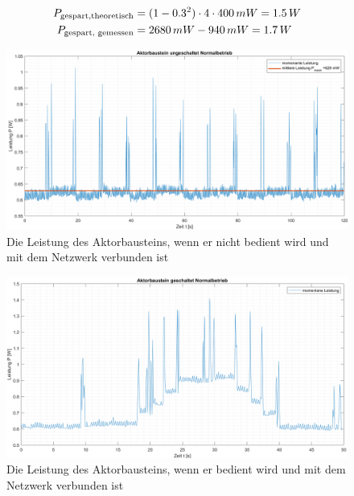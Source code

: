 \begin{align}
P_\text{gespart,theoretisch} &= (1-0.3^2) \cdot 4 \cdot 400\,mW = 1.5\,W \label{eq: P_{gespart,theoretisch}} \\
P_\text{gespart, gemessen} &= 2680\,mW - 940\,mW = 1.7\,W \label{P_{gespart, gemessen}}
\end{align}

\begin{figure}[H]
	\centering
	\includegraphics[width=1\textwidth]{graphics/Aktorbaustein_ungeschaltet.png}
	\caption{Die Leistung des Aktorbausteins, wenn er nicht bedient wird und mit dem Netzwerk verbunden ist}
	\label{pic: Aktorbaustein_ungeschaltet}
\end{figure}

\begin{figure}[H]
	\centering
	\includegraphics[width=1\textwidth]{graphics/Aktorbaustein_geschaltet.png}
	\caption{Die Leistung des Aktorbausteins, wenn er bedient wird und mit dem Netzwerk verbunden ist}
	\label{pic: Aktorbaustein_geschaltet}
\end{figure}

